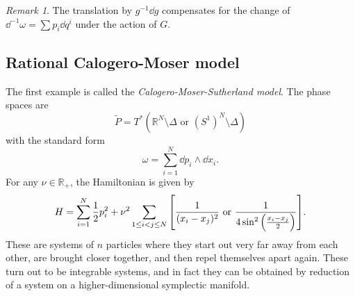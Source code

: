\documentclass[leqno, openany]{memoir}
\theoremstyle{definition}
\theoremstyle{remark}
\newtheorem{rmk}[thm]{Remark}
\theoremstyle{plain}
\theoremstyle{definition}
\theoremstyle{remark}
\newcommand{\R}{\mathbb{R}}
\newcommand{\wt}[1]{\widetilde{#1}}
\begin{document}
\begin{rmk}
The translation by $g^{-1} \dd{g}$ compensates for the change of $\dd^{-1} \omega = \sum p_i \dd{q^i}$ under the action of $G$.
\end{rmk}

\subsection{Rational Calogero-Moser model}
\label{sub:ratlcms}

The first example is called the \textit{Calogero-Moser-Sutherland model}. The phase spaces are
\[ \wt{P} = T^* (\R^N \setminus \Delta \text{ or } (S^1)^N \setminus \Delta )\]
with the standard form
\[ \omega = \sum_{i=1}^N \dd{p_i} \wedge \dd{x_i}. \]
For any $\nu \in \R_+$, the Hamiltonian is given by
\[ H = \sum_{i=1}^N \frac{1}{2} p_i^2 + \nu^2 \sum_{1 \leq i < j \leq N} \qty[\frac{1}{(x_i-x_j)^2} \text{ or }\frac{1}{4\sin^2\qty(\frac{x_i-x_j}{2})} ]. \]
These are systems of $n$ particles where they start out very far away from each other, are brought closer together, and then repel themselves apart again. These turn out to be integrable systems, and in fact they can be obtained by reduction of a system on a higher-dimensional symplectic manifold.
\end{document}
